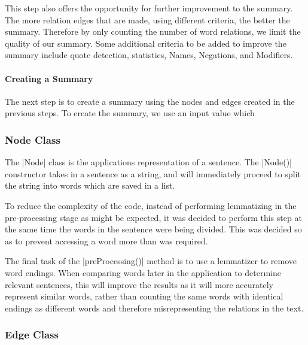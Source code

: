 		This step also offers the opportunity for further improvement to the summary. The more relation edges that are made, using different criteria, the better the summary. Therefore by only counting the number of word relations, we limit the quality of our summary. Some additional criteria to be added to improve the summary include quote detection, statistics, Names, Negations, and Modifiers.
		
	\paragraph{Creating a Summary}
	
		The next step is to create a summary using the nodes and edges created in the previous steps. To create the summary, we use an input value which 
	
	\subsubsection{Node Class}
	
		The |Node| class is the applications representation of a sentence. The |Node()| constructor takes in a sentence as a string, and will immediately proceed to split the string into words which are saved in a list. 
		
		To reduce the complexity of the code, instead of performing lemmatizing in the pre-processing stage as might be expected, it was decided to perform this step at the same time the words in the sentence were being divided. This was decided so as to prevent accessing a word more than was required.
		
		The final task of the |preProcessing()| method is to use a lemmatizer to remove word endings. When comparing words later in the application to determine relevant sentences, this will improve the results as it will more accurately represent similar words, rather than counting the same words with identical endings as different words and therefore misrepresenting the relations in the text.
		
	
	\subsubsection{Edge Class}
	
	
	
